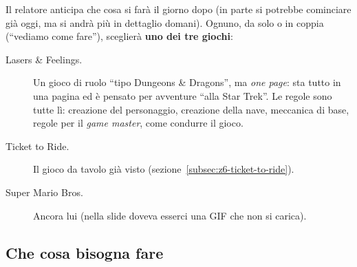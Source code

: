 Il relatore anticipa che cosa si farà il giorno dopo (in parte si potrebbe
cominciare già oggi, ma si andrà più in dettaglio domani). Ognuno, da solo o in
coppia (``vediamo come fare''), sceglierà \textbf{uno dei tre giochi}:
\begin{description}
  \item[Lasers \& Feelings.] Un gioco di ruolo ``tipo Dungeons \& Dragons'', ma
        \emph{one page}: sta tutto in una pagina ed è pensato per avventure ``alla
        Star Trek''. Le regole sono tutte lì: creazione del personaggio,
        creazione della nave, meccanica di base, regole per il \emph{game
        master}, come condurre il gioco.
  \item[Ticket to Ride.] Il gioco da tavolo già visto
        (sezione~\ref{subsec:z6-ticket-to-ride}).
  \item[Super Mario Bros.] Ancora lui (nella slide doveva esserci una GIF che non
        si carica).
\end{description}

\subsection{Che cosa bisogna fare}

